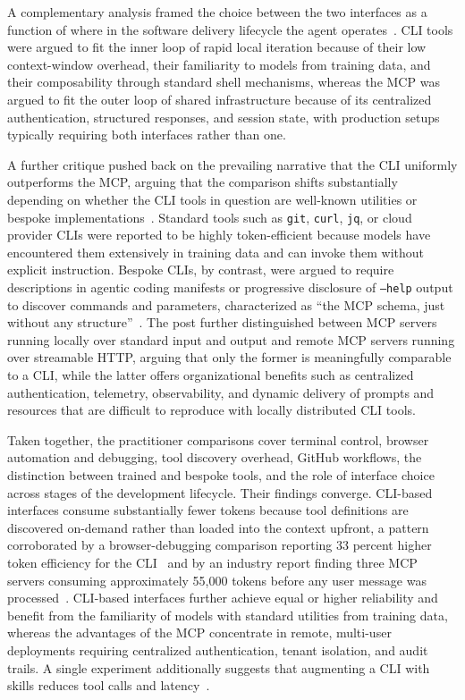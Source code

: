 \documentclass[
english,                 %
bibtex,                  %
]{kththesis}
\numberwithin{listing}{chapter}
\begin{document}
A complementary analysis framed the choice between the two interfaces as a function of where in the software delivery lifecycle the agent operates~\cite{schmitt_mcp_2026}. \gls{CLI} tools were argued to fit the inner loop of rapid local iteration because of their low context-window overhead, their familiarity to models from training data, and their composability through standard shell mechanisms, whereas the \gls{MCP} was argued to fit the outer loop of shared infrastructure because of its centralized authentication, structured responses, and session state, with production setups typically requiring both interfaces rather than one.

A further critique pushed back on the prevailing narrative that the \gls{CLI} uniformly outperforms the \gls{MCP}, arguing that the comparison shifts substantially depending on whether the \gls{CLI} tools in question are well-known utilities or bespoke implementations~\cite{chen_mcp_2026}. Standard tools such as \texttt{git}, \texttt{curl}, \texttt{jq}, or cloud provider \glspl{CLI} were reported to be highly token-efficient because models have encountered them extensively in training data and can invoke them without explicit instruction. Bespoke \glspl{CLI}, by contrast, were argued to require descriptions in agentic coding manifests or progressive disclosure of \texttt{--help} output to discover commands and parameters, characterized as ``the \gls{MCP} schema, just without any structure''~\cite{chen_mcp_2026}. The post further distinguished between \gls{MCP} servers running locally over standard input and output and remote \gls{MCP} servers running over streamable \gls{HTTP}, arguing that only the former is meaningfully comparable to a \gls{CLI}, while the latter offers organizational benefits such as centralized authentication, telemetry, observability, and dynamic delivery of prompts and resources that are difficult to reproduce with locally distributed \gls{CLI} tools.

Taken together, the practitioner comparisons cover terminal control, browser automation and debugging, tool discovery overhead, GitHub workflows, the distinction between trained and bespoke tools, and the role of interface choice across stages of the development lifecycle. Their findings converge. \gls{CLI}-based interfaces consume substantially fewer tokens because tool definitions are discovered on-demand rather than loaded into the context upfront, a pattern corroborated by a browser-debugging comparison reporting 33 percent higher token efficiency for the \gls{CLI}~\cite{kumak_mcp_2025} and by an industry report finding three \gls{MCP} servers consuming approximately 55,000 tokens before any user message was processed~\cite{amzani_your_2026}. \gls{CLI}-based interfaces further achieve equal or higher reliability and benefit from the familiarity of models with standard utilities from training data, whereas the advantages of the \gls{MCP} concentrate in remote, multi-user deployments requiring centralized authentication, tenant isolation, and audit trails. A single experiment additionally suggests that augmenting a \gls{CLI} with skills reduces tool calls and latency~\cite{madabhushi_mcp_2026}.
\end{document}
